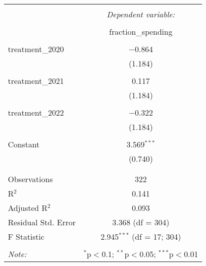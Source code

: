 
\begin{table}[!htbp] \centering 
  \caption{} 
  \label{} 
\begin{tabular}{@{\extracolsep{5pt}}lc} 
\\[-1.8ex]\hline 
\hline \\[-1.8ex] 
 & \multicolumn{1}{c}{\textit{Dependent variable:}} \\ 
\cline{2-2} 
\\[-1.8ex] & fraction\_spending \\ 
\hline \\[-1.8ex] 
 treatment\_2020 & $-$0.864 \\ 
  & (1.184) \\ 
  & \\ 
 treatment\_2021 & 0.117 \\ 
  & (1.184) \\ 
  & \\ 
 treatment\_2022 & $-$0.322 \\ 
  & (1.184) \\ 
  & \\ 
 Constant & 3.569$^{***}$ \\ 
  & (0.740) \\ 
  & \\ 
\hline \\[-1.8ex] 
Observations & 322 \\ 
R$^{2}$ & 0.141 \\ 
Adjusted R$^{2}$ & 0.093 \\ 
Residual Std. Error & 3.368 (df = 304) \\ 
F Statistic & 2.945$^{***}$ (df = 17; 304) \\ 
\hline 
\hline \\[-1.8ex] 
\textit{Note:}  & \multicolumn{1}{r}{$^{*}$p$<$0.1; $^{**}$p$<$0.05; $^{***}$p$<$0.01} \\ 
\end{tabular} 
\end{table} 
